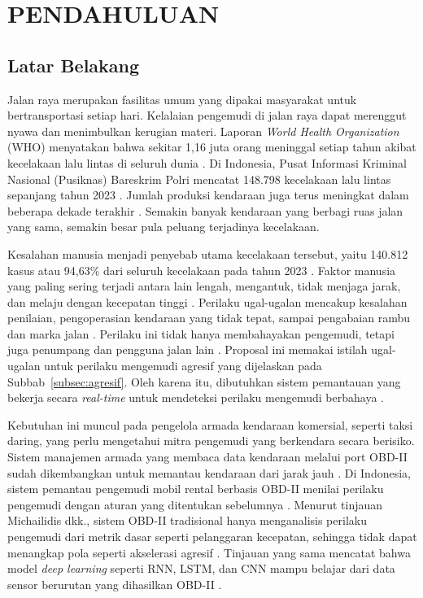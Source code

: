 \chapter{PENDAHULUAN}

\section{Latar Belakang}

Jalan raya merupakan fasilitas umum yang dipakai masyarakat untuk bertransportasi setiap hari. Kelalaian pengemudi di jalan raya dapat merenggut nyawa dan menimbulkan kerugian materi. Laporan \textit{World Health Organization} (WHO) menyatakan bahwa sekitar 1,16 juta orang meninggal setiap tahun akibat kecelakaan lalu lintas di seluruh dunia \cite{WHO2026}. Di Indonesia, Pusat Informasi Kriminal Nasional (Pusiknas) Bareskrim Polri mencatat 148.798 kecelakaan lalu lintas sepanjang tahun 2023 \cite{Databoks2024}. Jumlah produksi kendaraan juga terus meningkat dalam beberapa dekade terakhir \cite{Chauhan2020}. Semakin banyak kendaraan yang berbagi ruas jalan yang sama, semakin besar pula peluang terjadinya kecelakaan.

Kesalahan manusia menjadi penyebab utama kecelakaan tersebut, yaitu 140.812 kasus atau 94,63\% dari seluruh kecelakaan pada tahun 2023 \cite{Databoks2024}. Faktor manusia yang paling sering terjadi antara lain lengah, mengantuk, tidak menjaga jarak, dan melaju dengan kecepatan tinggi \cite{Mubalus2023}. Perilaku ugal-ugalan mencakup kesalahan penilaian, pengoperasian kendaraan yang tidak tepat, sampai pengabaian rambu dan marka jalan \cite{Chauhan2020}. Perilaku ini tidak hanya membahayakan pengemudi, tetapi juga penumpang dan pengguna jalan lain \cite{Sutikno2025}. Proposal ini memakai istilah ugal-ugalan untuk perilaku mengemudi agresif yang dijelaskan pada Subbab~\ref{subsec:agresif}. Oleh karena itu, dibutuhkan sistem pemantauan yang bekerja secara \textit{real-time} untuk mendeteksi perilaku mengemudi berbahaya \cite{Heo2020}.

Kebutuhan ini muncul pada pengelola armada kendaraan komersial, seperti taksi daring, yang perlu mengetahui mitra pengemudi yang berkendara secara berisiko. Sistem manajemen armada yang membaca data kendaraan melalui port OBD-II sudah dikembangkan untuk memantau kendaraan dari jarak jauh \cite{Malekian2017}. Di Indonesia, sistem pemantau pengemudi mobil rental berbasis OBD-II menilai perilaku pengemudi dengan aturan yang ditentukan sebelumnya \cite{Rahayu2021}. Menurut tinjauan Michailidis dkk., sistem OBD-II tradisional hanya menganalisis perilaku pengemudi dari metrik dasar seperti pelanggaran kecepatan, sehingga tidak dapat menangkap pola seperti akselerasi agresif \cite{Michailidis2025}. Tinjauan yang sama mencatat bahwa model \textit{deep learning} seperti RNN, LSTM, dan CNN mampu belajar dari data sensor berurutan yang dihasilkan OBD-II \cite{Michailidis2025}.

